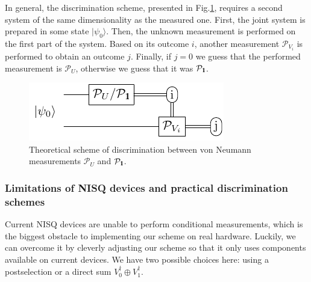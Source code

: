 \documentclass[preprint,12pt, a4paper]{elsarticle}
\newcommand{\ket}[1]{\ensuremath{|#1\rangle}}
\newcommand{\1}{{\rm 1\hspace{-0.9mm}l}}
\newcommand{\Id}{{\rm 1\hspace{-0.9mm}l}}
\newcommand{\PP}{\mathcal{P}}
\begin{document}
In general, the discrimination scheme, presented in Fig.\ref{fig:theoretical_scheme}, requires a
second system of the same dimensionality as the measured one. First, the joint system is prepared in
some state $\ket{\psi_0}$. Then, the unknown measurement is performed on the first part of the
system. Based on its outcome $i$, another measurement $\mathcal{P}_{V_i}$ is performed to obtain an
outcome $j$. Finally, if $j=0$ we guess that the performed measurement is $\mathcal{P}_U$, otherwise
we guess that it was $\mathcal{P}_\Id$.

\begin{figure}[h!]
	\centering
	\includegraphics[scale=1.7]{pics/theoretical_scheme}
	\caption{Theoretical  scheme of discrimination  between von Neumann measurements $\PP_{U}$ and $\PP_\Id$. }
	\label{fig:theoretical_scheme}
\end{figure}

\subsubsection{Limitations of NISQ devices and practical discrimination schemes}

Current NISQ devices are unable to perform conditional measurements, which is the biggest
obstacle to implementing our scheme on real hardware. Luckily, we can overcome it by
cleverly adjusting our scheme so that it only uses components available on current devices.
We have two possible choices here: using a postselection or a direct sum
$V_0^\dagger\oplus V_1^\dagger$.
\end{document}
